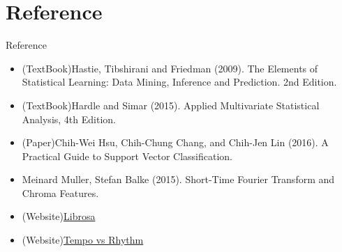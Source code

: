 \documentclass[11pt]{beamer}
\begin{document}
\section{Reference}
\begin{frame}{Reference}
\begin{itemize}
  \item (TextBook)Hastie, Tibshirani and Friedman (2009). The Elements of Statistical Learning: Data Mining, Inference and Prediction. 2nd Edition.
  \item (TextBook)Hardle and Simar (2015). Applied Multivariate Statistical Analysis, 4th Edition.
  \item (Paper)Chih-Wei Hsu, Chih-Chung Chang, and Chih-Jen Lin (2016). A Practical Guide to Support Vector Classification.
  \item  Meinard Muller, Stefan Balke (2015). Short-Time Fourier Transform and Chroma Features.
  \item (Website)\href{https://librosa.org/doc/latest/index.html}{Librosa} \item (Website)\href{https://www.britannica.com/story/whats-the-difference-between-tempo-and-rhythm}{Tempo vs Rhythm}
\end{itemize}
\end{frame}
\end{document}
